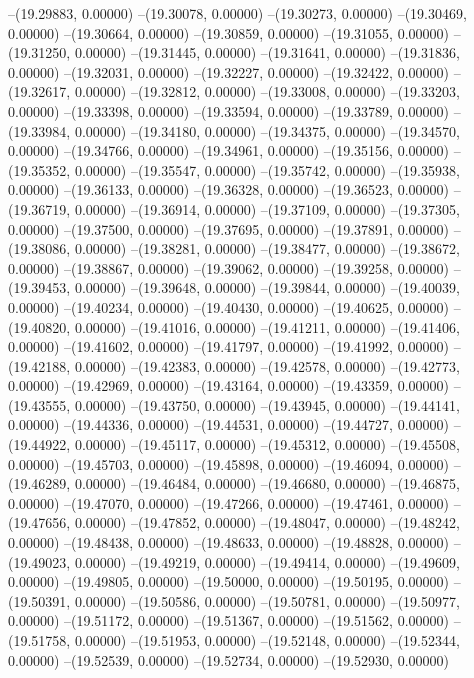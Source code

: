 --(19.29883, 0.00000)
--(19.30078, 0.00000)
--(19.30273, 0.00000)
--(19.30469, 0.00000)
--(19.30664, 0.00000)
--(19.30859, 0.00000)
--(19.31055, 0.00000)
--(19.31250, 0.00000)
--(19.31445, 0.00000)
--(19.31641, 0.00000)
--(19.31836, 0.00000)
--(19.32031, 0.00000)
--(19.32227, 0.00000)
--(19.32422, 0.00000)
--(19.32617, 0.00000)
--(19.32812, 0.00000)
--(19.33008, 0.00000)
--(19.33203, 0.00000)
--(19.33398, 0.00000)
--(19.33594, 0.00000)
--(19.33789, 0.00000)
--(19.33984, 0.00000)
--(19.34180, 0.00000)
--(19.34375, 0.00000)
--(19.34570, 0.00000)
--(19.34766, 0.00000)
--(19.34961, 0.00000)
--(19.35156, 0.00000)
--(19.35352, 0.00000)
--(19.35547, 0.00000)
--(19.35742, 0.00000)
--(19.35938, 0.00000)
--(19.36133, 0.00000)
--(19.36328, 0.00000)
--(19.36523, 0.00000)
--(19.36719, 0.00000)
--(19.36914, 0.00000)
--(19.37109, 0.00000)
--(19.37305, 0.00000)
--(19.37500, 0.00000)
--(19.37695, 0.00000)
--(19.37891, 0.00000)
--(19.38086, 0.00000)
--(19.38281, 0.00000)
--(19.38477, 0.00000)
--(19.38672, 0.00000)
--(19.38867, 0.00000)
--(19.39062, 0.00000)
--(19.39258, 0.00000)
--(19.39453, 0.00000)
--(19.39648, 0.00000)
--(19.39844, 0.00000)
--(19.40039, 0.00000)
--(19.40234, 0.00000)
--(19.40430, 0.00000)
--(19.40625, 0.00000)
--(19.40820, 0.00000)
--(19.41016, 0.00000)
--(19.41211, 0.00000)
--(19.41406, 0.00000)
--(19.41602, 0.00000)
--(19.41797, 0.00000)
--(19.41992, 0.00000)
--(19.42188, 0.00000)
--(19.42383, 0.00000)
--(19.42578, 0.00000)
--(19.42773, 0.00000)
--(19.42969, 0.00000)
--(19.43164, 0.00000)
--(19.43359, 0.00000)
--(19.43555, 0.00000)
--(19.43750, 0.00000)
--(19.43945, 0.00000)
--(19.44141, 0.00000)
--(19.44336, 0.00000)
--(19.44531, 0.00000)
--(19.44727, 0.00000)
--(19.44922, 0.00000)
--(19.45117, 0.00000)
--(19.45312, 0.00000)
--(19.45508, 0.00000)
--(19.45703, 0.00000)
--(19.45898, 0.00000)
--(19.46094, 0.00000)
--(19.46289, 0.00000)
--(19.46484, 0.00000)
--(19.46680, 0.00000)
--(19.46875, 0.00000)
--(19.47070, 0.00000)
--(19.47266, 0.00000)
--(19.47461, 0.00000)
--(19.47656, 0.00000)
--(19.47852, 0.00000)
--(19.48047, 0.00000)
--(19.48242, 0.00000)
--(19.48438, 0.00000)
--(19.48633, 0.00000)
--(19.48828, 0.00000)
--(19.49023, 0.00000)
--(19.49219, 0.00000)
--(19.49414, 0.00000)
--(19.49609, 0.00000)
--(19.49805, 0.00000)
--(19.50000, 0.00000)
--(19.50195, 0.00000)
--(19.50391, 0.00000)
--(19.50586, 0.00000)
--(19.50781, 0.00000)
--(19.50977, 0.00000)
--(19.51172, 0.00000)
--(19.51367, 0.00000)
--(19.51562, 0.00000)
--(19.51758, 0.00000)
--(19.51953, 0.00000)
--(19.52148, 0.00000)
--(19.52344, 0.00000)
--(19.52539, 0.00000)
--(19.52734, 0.00000)
--(19.52930, 0.00000)
